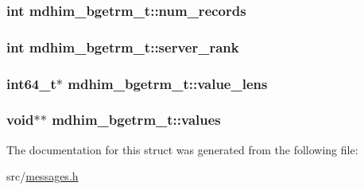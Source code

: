 \hypertarget{structmdhim__bgetrm__t_a3d398b31f450603e67b854ab563180e8}{
\subsubsection[{num\-\_\-records}]{\setlength{\rightskip}{0pt plus 5cm}int mdhim\-\_\-bgetrm\-\_\-t\-::num\-\_\-records}}\label{d0/d48/structmdhim__bgetrm__t_a3d398b31f450603e67b854ab563180e8}
\hypertarget{structmdhim__bgetrm__t_a3113667adc0eafe85d22c273766bce7f}{
\subsubsection[{server\-\_\-rank}]{\setlength{\rightskip}{0pt plus 5cm}int mdhim\-\_\-bgetrm\-\_\-t\-::server\-\_\-rank}}\label{d0/d48/structmdhim__bgetrm__t_a3113667adc0eafe85d22c273766bce7f}
\hypertarget{structmdhim__bgetrm__t_a689b35993bf4fbe82b9934ba760ca7df}{
\subsubsection[{value\-\_\-lens}]{\setlength{\rightskip}{0pt plus 5cm}int64\-\_\-t$\ast$ mdhim\-\_\-bgetrm\-\_\-t\-::value\-\_\-lens}}\label{d0/d48/structmdhim__bgetrm__t_a689b35993bf4fbe82b9934ba760ca7df}
\hypertarget{structmdhim__bgetrm__t_a322850d7fda46b0c170ca98342a81779}{
\subsubsection[{values}]{\setlength{\rightskip}{0pt plus 5cm}void$\ast$$\ast$ mdhim\-\_\-bgetrm\-\_\-t\-::values}}\label{d0/d48/structmdhim__bgetrm__t_a322850d7fda46b0c170ca98342a81779}


The documentation for this struct was generated from the following file\-:\begin{DoxyCompactItemize}
\item 
src/\hyperlink{messages_8h}{messages.\-h}\end{DoxyCompactItemize}
